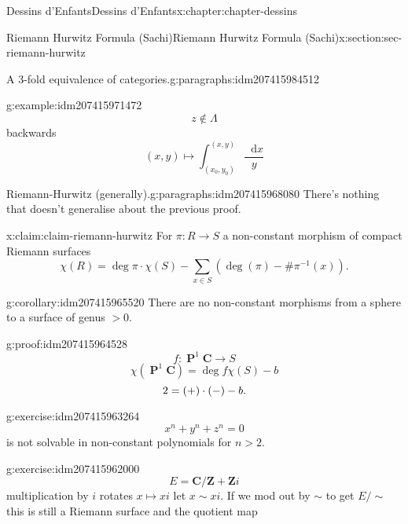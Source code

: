 \documentclass[oneside,10pt,]{book}
\newcommand{\qedhere}{\relax}
\numberwithin{equation}{section}
\newcommand{\diff}{\mathop{}\!\mathrm{d}}
\newcommand{\inv}{^{-1}}
\newcommand{\ZZ}{\mathbf{Z}}
\newcommand{\CC}{\mathbf{C}}
\DeclareMathOperator{\PP}{\mathbf{P}}
\newcommand{\gt}{>}
\begin{document}
\begin{chapterptx}{Dessins d'Enfants}{}{Dessins d'Enfants}{}{}{x:chapter:chapter-dessins}
\begin{sectionptx}{Riemann Hurwitz Formula (Sachi)}{}{Riemann Hurwitz Formula (Sachi)}{}{}{x:section:sec-riemann-hurwitz}
\begin{paragraphs}{A 3-fold equivalence of categories.}{g:paragraphs:idm207415984512}
\begin{example}{}{g:example:idm207415971472}
\begin{equation*}
\end{equation*}
%
\begin{equation*}
z\not\in \Lambda
\end{equation*}
backwards%
\begin{equation*}
(x,y) \mapsto \int_{(x_0, y_0)}^{(x,y)} \frac{\diff x}{y}
\end{equation*}
%
\end{example}
\end{paragraphs}%
\begin{paragraphs}{Riemann-Hurwitz (generally).}{g:paragraphs:idm207415968080}%
There's nothing that doesn't generalise about the previous proof.%
\begin{claim}{}{}{x:claim:claim-riemann-hurwitz}%
For \(\pi\colon R\to S\) a non-constant morphism of compact Riemann surfaces%
\begin{equation*}
\chi(R) = \deg \pi \cdot \chi(S)  - \sum_{x\in S} (\deg(\pi) - \#\pi\inv(x))\text{.}
\end{equation*}
%
\end{claim}
\begin{corollary}{}{}{g:corollary:idm207415965520}%
There are no non-constant morphisms from a sphere to a surface of genus \(\gt 0\).%
\end{corollary}
\begin{proofptx}{}{g:proof:idm207415964528}
%
\begin{equation*}
f\colon \PP^1 \CC \to S
\end{equation*}
%
\begin{equation*}
\chi(\PP^1 \CC) = \deg f \chi(S) - b
\end{equation*}
%
\begin{equation*}
2 = (+)\cdot (-) - b\text{.}\qedhere
\end{equation*}
%
\end{proofptx}
\begin{inlineexercise}{}{g:exercise:idm207415963264}%
%
\begin{equation*}
x^n  +y^ n + z^n = 0
\end{equation*}
is not solvable in non-constant polynomials for \(n \gt 2\).%
\end{inlineexercise}
\begin{inlineexercise}{}{g:exercise:idm207415962000}%
%
\begin{equation*}
E = \CC/ \ZZ + \ZZ i
\end{equation*}
multiplication by \(i\) rotates \(x \mapsto xi\) let \(x \sim xi\). If we mod out by \(\sim\) to get \(E/\sim\) this is still a Riemann surface and the quotient map%

\end{inlineexercise}
\end{paragraphs}
\end{sectionptx}
\end{chapterptx}
\end{document}
